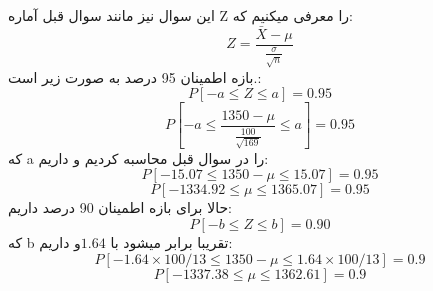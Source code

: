\problem{}
این سوال نیز مانند سوال قبل آماره Z را معرفی میکنیم 
که:\\
\[
    Z = \frac{\bar{X}-\mu}{\frac{\sigma}{\sqrt{n}}}
\]
بازه اطمینان 95 درصد به صورت زیر است.:\\
\[
    P[-a \leq Z \leq a] = 0.95    
\]
\[
    P[-a \leq \frac{1350-\mu}{\frac{100}{\sqrt{169}}} \leq a] = 0.95 
\]
که a را در سوال قبل محاسبه کردیم و داریم:
\[
    P[- 15.07 \leq 1350-\mu \leq 15.07] = 0.95 
\]
\[
    P[-1334.92 \leq \mu \leq 1365.07] = 0.95 
\]
حالا برای بازه اطمینان 90 درصد داریم:\\
\[
    P[-b \leq Z \leq b] = 0.90
\]
که b تقریبا برابر میشود با  $1.64$و داریم:\\
\[
    P[- 1.64 \times 100/13 \leq 1350-\mu \leq 1.64 \times 100/13] = 0.9
\]
\[
    P[-1337.38  \leq \mu \leq 1362.61] = 0.9
\]